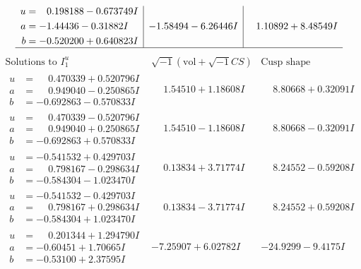 \documentclass[1p]{elsarticle_modified}
\theoremstyle{definition}
\newcommand{\I}{\sqrt{-1}}
\begin{document}
$$\begin{array}{c|c|c}
\begin{aligned}
u &= \phantom{-}0.198188 - 0.673749 I \\
a &= -1.44436 - 0.31882 I \\
b &= -0.520200 + 0.640823 I\end{aligned}
 & -1.58494 - 6.26446 I & \phantom{-}1.10892 + 8.48549 I\\
 \hline 
 \end{array}$$\newpage$$\begin{array}{c|c|c}  
\text{Solutions to }I^u_{1}& \I (\text{vol} + \sqrt{-1}CS) & \text{Cusp shape}\\
 \hline 
\begin{aligned}
u &= \phantom{-}0.470339 + 0.520796 I \\
a &= \phantom{-}0.949040 - 0.250865 I \\
b &= -0.692863 - 0.570833 I\end{aligned}
 & \phantom{-}1.54510 + 1.18608 I & \phantom{-}8.80668 + 0.32091 I \\ \hline\begin{aligned}
u &= \phantom{-}0.470339 - 0.520796 I \\
a &= \phantom{-}0.949040 + 0.250865 I \\
b &= -0.692863 + 0.570833 I\end{aligned}
 & \phantom{-}1.54510 - 1.18608 I & \phantom{-}8.80668 - 0.32091 I \\ \hline\begin{aligned}
u &= -0.541532 + 0.429703 I \\
a &= \phantom{-}0.798167 - 0.298634 I \\
b &= -0.584304 - 1.023470 I\end{aligned}
 & \phantom{-}0.13834 + 3.71774 I & \phantom{-}8.24552 - 0.59208 I \\ \hline\begin{aligned}
u &= -0.541532 - 0.429703 I \\
a &= \phantom{-}0.798167 + 0.298634 I \\
b &= -0.584304 + 1.023470 I\end{aligned}
 & \phantom{-}0.13834 - 3.71774 I & \phantom{-}8.24552 + 0.59208 I \\ \hline\begin{aligned}
u &= \phantom{-}0.201344 + 1.294790 I \\
a &= -0.60451 + 1.70665 I \\
b &= -0.53100 + 2.37595 I\end{aligned}
 & -7.25907 + 6.02782 I & -24.9299 - 9.4175 I \\ \hline\begin{aligned}

\end{aligned}
\end{array}$$
\end{document}
